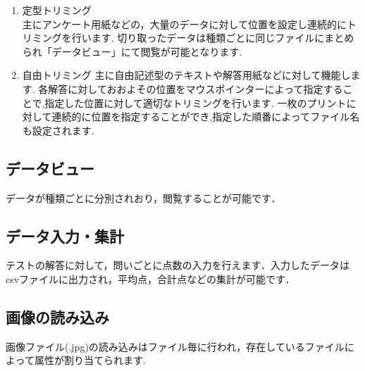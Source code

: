 \documentclass[12pt]{jsarticle}
\begin{document}
\begin{enumerate}
    \item 定型トリミング \\
    主にアンケート用紙などの，大量のデータに対して位置を設定し連続的にトリミングを行います.
    切り取ったデータは種類ごとに同じファイルにまとめられ「データビュー」にて閲覧が可能となります.
    \item 自由トリミング
    主に自由記述型のテキストや解答用紙などに対して機能します.
    各解答に対しておおよその位置をマウスポインターによって指定することで,指定した位置に対して適切なトリミングを行います.
    一枚のプリントに対して連続的に位置を指定することができ,指定した順番によってファイル名も設定されます.

\end{enumerate}

\subsection{データビュー}
データが種類ごとに分別されおり，閲覧することが可能です．
\subsection{データ入力・集計}
テストの解答に対して，問いごとに点数の入力を行えます．入力したデータはcsvファイルに出力され，平均点，合計点などの集計が可能です．
\subsection{画像の読み込み}
画像ファイル(.jpg)の読み込みはファイル毎に行われ，存在しているファイルによって属性が割り当てられます.

\newpage
\end{document}

